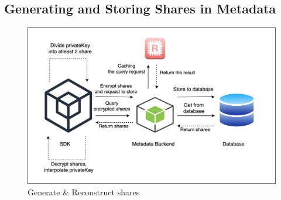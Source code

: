 \documentclass[../Main.tex]{subfiles}
\begin{document}
\subsection{Generating and Storing Shares in Metadata}
\begin{figure}[H]
 \centering
 \includegraphics[scale=0.14]{Figure/generate-share.png}
 \caption{Generate & Reconstruct shares}
    \label{fig:generate-share}
\end{figure}
\end{document}
